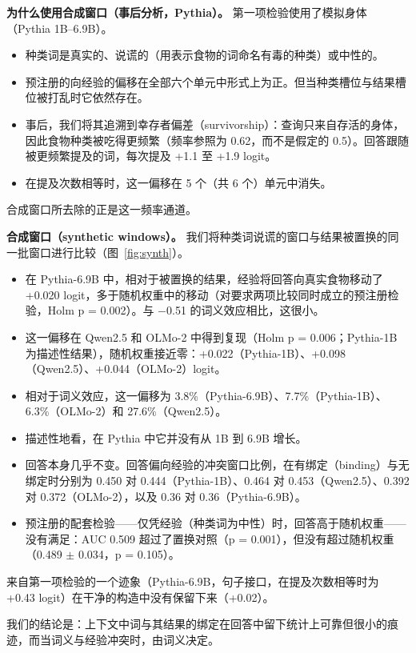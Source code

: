 \documentclass[UTF8,fontset=none,a4paper]{ctexart}
\begin{document}
\textbf{为什么使用合成窗口（事后分析，Pythia）。} 第一项检验使用了模拟身体（Pythia \mbox{1B--6.9B}）。
\begin{itemize}
\item 种类词是真实的、说谎的（用表示食物的词命名有毒的种类）或中性的。
\item 预注册的向经验的偏移在全部六个单元中形式上为正。但当种类槽位与结果槽位被打乱时它依然存在。
\item 事后，我们将其追溯到幸存者偏差（survivorship）：查询只来自存活的身体，因此食物种类被吃得更频繁（频率参照为 0.62，而不是假定的 0.5）。回答跟随被更频繁提及的词，每次提及 +1.1 至 +1.9 logit。
\item 在提及次数相等时，这一偏移在 5 个（共 6 个）单元中消失。
\end{itemize}

合成窗口所去除的正是这一频率通道。

\textbf{合成窗口（synthetic windows）。} 我们将种类词说谎的窗口与结果被置换的同一批窗口进行比较（图~\ref{fig:synth}）。
\begin{itemize}
\item 在 \mbox{Pythia-6.9B} 中，相对于被置换的结果，经验将回答向真实食物移动了 +0.020 logit，多于随机权重中的移动（对要求两项比较同时成立的预注册检验，Holm p = 0.002）。与 $-$0.51 的词义效应相比，这很小。
\item 这一偏移在 Qwen2.5 和 \mbox{OLMo-2} 中得到复现（Holm p = 0.006；\mbox{Pythia-1B} 为描述性结果），随机权重接近零：+0.022（\mbox{Pythia-1B}）、+0.098（Qwen2.5）、+0.044（\mbox{OLMo-2}）logit。
\item 相对于词义效应，这一偏移为 3.8\%（\mbox{Pythia-6.9B}）、7.7\%（\mbox{Pythia-1B}）、6.3\%（\mbox{OLMo-2}）和 27.6\%（Qwen2.5）。
\item 描述性地看，在 Pythia 中它并没有从 1B 到 6.9B 增长。
\item 回答本身几乎不变。回答偏向经验的冲突窗口比例，在有绑定（binding）与无绑定时分别为 0.450 对 0.444（\mbox{Pythia-1B}）、0.464 对 0.453（Qwen2.5）、0.392 对 0.372（\mbox{OLMo-2}），以及 0.36 对 0.36（\mbox{Pythia-6.9B}）。
\item 预注册的配套检验------仅凭经验（种类词为中性）时，回答高于随机权重------没有满足：AUC 0.509 超过了置换对照（p = 0.001），但没有超过随机权重（0.489 $\pm$ 0.034，p = 0.105）。
\end{itemize}

来自第一项检验的一个迹象（\mbox{Pythia-6.9B}，句子接口，在提及次数相等时为 +0.43 logit）在干净的构造中没有保留下来（+0.02）。

我们的结论是：上下文中词与其结果的绑定在回答中留下统计上可靠但很小的痕迹，而当词义与经验冲突时，由词义决定。
\end{document}
